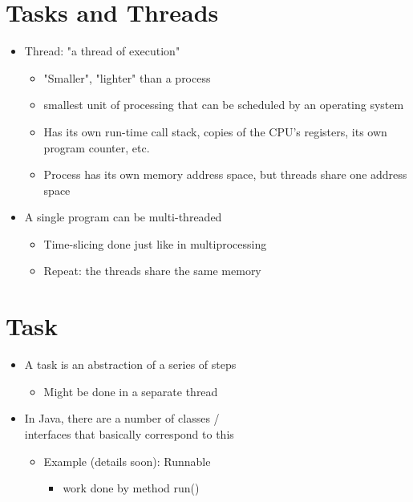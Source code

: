 \documentclass[12pt, a4paper]{book}
\begin{document}
\section{Tasks and Threads}
\begin{itemize}
    \item Thread: "a thread of execution"
          \begin{itemize}
              \item "Smaller", "lighter" than a process
              \item smallest unit of processing that can be scheduled by an operating system
              \item Has its own run-time call stack, copies of the CPU's registers, its own program counter, etc.
              \item Process has its own memory address space, but threads share one address space
          \end{itemize}
    \item A single program can be multi-threaded
          \begin{itemize}
              \item Time-slicing done just like in multiprocessing
              \item Repeat: the threads share the same memory
          \end{itemize}
\end{itemize}

\section{Task}
\begin{itemize}
    \item A task is an abstraction of a series of steps
          \begin{itemize}
              \item Might be done in a separate thread
          \end{itemize}
    \item In Java, there are a number of classes /\\
          interfaces that basically correspond to this
          \begin{itemize}
              \item Example (details soon): Runnable
                    \begin{itemize}
                        \item work done by method run()
                    \end{itemize}
          \end{itemize}
\end{itemize}
\end{document}
